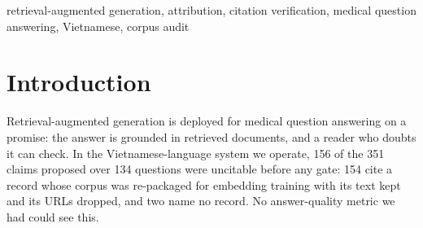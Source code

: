 \documentclass[conference,a4paper]{IEEEtran}
\begin{document}
\begin{abstract}
Retrieval-augmented generation (RAG) is adopted for medical question answering on a promise of
traceability, yet whether a retrieval corpus's records can be cited at all, and what enforcing
citability costs at serving time, is rarely checked. We audit the corpus and serving path of
one Vietnamese medical RAG research prototype. In its index, \SI{43}{\percent} of chunks
carry no source URL, because one re-packaged dataset kept its text and dropped its links, and
a further \SI{13}{\percent} carry a URL that opens an issue index, not the article. On the
serving path, withholding uncitable claims after generation keeps \num{0.53} of extracted
claims; excluding the URL-less records at retrieval avoids that withholding by construction
(\num{0.96}, one run per design). Under both designs almost every returned attribution entry
is supported by its passage, yet only a few per hundred answer the question. Our message:
traceability of the attribution list can be enforced by code; where the citability check sits
decides what is withheld; and high support coexists with very low claim-level responsiveness.
Responsiveness is measured on returned attribution entries under a verbatim-copy extractor,
not as an end-to-end answer-quality rate, and the design comparison is two single runs.
\end{abstract}

\begin{IEEEkeywords}
retrieval-augmented generation, attribution, citation verification, medical question answering, Vietnamese, corpus audit
\end{IEEEkeywords}

\section{Introduction}Retrieval-augmented generation is deployed for medical question answering on a promise: the
answer is grounded in retrieved documents, and a reader who doubts it can check. In the
Vietnamese-language system we operate, \num{156} of the \num{351} claims proposed over 134
questions were uncitable before any gate: \num{154} cite a record whose corpus was re-packaged
for embedding training with its text kept and its URLs dropped, and two name no record. No
answer-quality metric we had could see this.
\end{document}
